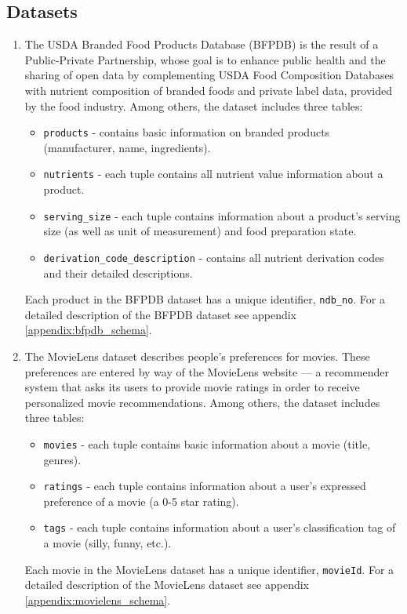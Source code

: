 \subsection{Datasets}\label{sec:datasets}
\begin{enumerate}
    \item The USDA Branded Food Products Database (BFPDB) \cite{usda_bfpd-dataset} is the result of a Public-Private Partnership, whose goal is to enhance public health and the sharing of open data by complementing USDA Food Composition Databases with nutrient composition of branded foods and private label data, provided by the food industry. Among others, the dataset includes three tables:
    \begin{itemize}
        \item \texttt{products} - contains basic information on branded products (manufacturer, name, ingredients).
        \item \texttt{nutrients} - each tuple contains all nutrient value information about a product.
        \item \texttt{serving\_size} - each tuple contains information about a product's serving size (as well as unit of measurement) and food preparation state.
        \item \texttt{derivation\_code\_description} - contains all nutrient derivation codes and their detailed descriptions.
    \end{itemize}
    Each product in the BFPDB dataset has a unique identifier, \texttt{ndb\_no}. For a detailed description of the BFPDB dataset see appendix \ref{appendix:bfpdb_schema}.
    
    \item The MovieLens dataset \cite{movielens-dataset} describes people’s preferences for movies. These preferences are entered by way of the MovieLens website \cite{movielens-recommender-website} — a recommender system that asks its users to provide movie ratings in order to receive personalized movie recommendations. Among others, the dataset includes three tables:
    \begin{itemize}
        \item \texttt{movies} - each tuple contains basic information about a movie (title, genres).
        \item \texttt{ratings} - each tuple contains information about a user's expressed preference of a movie (a 0-5 star rating).
        \item \texttt{tags} - each tuple contains information about a user's classification tag of a movie (silly, funny, etc.).
    \end{itemize}
    Each movie in the MovieLens dataset has a unique identifier, \texttt{movieId}. For a detailed description of the MovieLens dataset see appendix \ref{appendix:movielens_schema}.
\end{enumerate}

